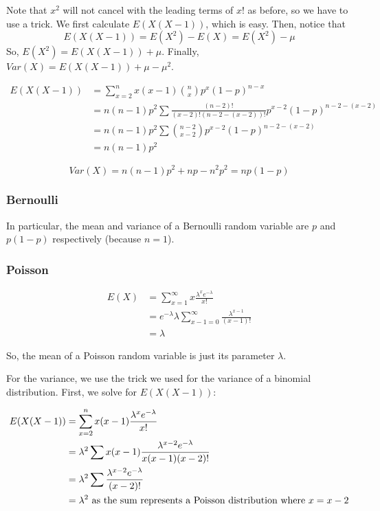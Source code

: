 \documentclass[12pt]{article}
\begin{document}
Note that $x^2$ will not cancel with the leading terms of $x!$ as before, so we have to use a trick. We first calculate $E(X(X-1))$, which is easy. Then, notice that
\[
    E(X (X-1)) = E(X^2) - E(X) = E(X^2) - \mu
\]
So, $E(X^2) = E(X(X-1)) + \mu$. Finally, $Var(X) = E(X(X-1)) + \mu - \mu^2$.

\begin{align*}
    E(X(X-1)) &= \sum_{x=2}^{n} x (x-1) {n \choose x} p^x (1-p)^{n-x} \\
        &= n (n-1) p^2 \sum \frac{(n-2)!}{(x-2)! (n-2-(x-2))!} p^{x-2} (1-p)^{n-2-(x-2)} \\
        &= n (n-1) p^2 \sum {{n-2} \choose {x-2}} p^{x-2} (1-p)^{n-2-(x-2)} \\
        &= n (n-1) p^2
\end{align*}

\[
    Var(X) = n (n-1) p^2 + np - n^2 p^2 = n p (1-p)
\]

\subsubsection{Bernoulli}

In particular, the mean and variance of a Bernoulli random variable are $p$ and $p (1-p)$ respectively (because $n=1$).

\subsubsection{Poisson}

\begin{align*}
    E(X) &= \sum_{x=1}^{\infty} x \frac{\lambda^{x} e^{- \lambda}}{x!} \\
        &= e^{- \lambda} \lambda \sum_{x-1 = 0}^{\infty} \frac{\lambda^{x-1}}{(x-1)!} \\
        &= \lambda
\end{align*}

So, the mean of a Poisson random variable is just its parameter $\lambda$.

For the variance, we use the trick we used for the variance of a binomial distribution. First, we solve for $E(X(X-1))$:

\begin{align*}
    E(X(X-1)) &= \sum_{x=2}^{n} x (x-1) \frac{\lambda^x e^{-\lambda}}{x!}{} \\
        &= \lambda^2 \sum x (x-1) \frac{\lambda^{x-2} e^{-\lambda}}{x(x-1)(x-2)!} \\
        &= \lambda^2 \sum \frac{\lambda^{x-2} e^{-\lambda}}{(x-2)!} \\
        &= \lambda^{2} \textnormal{ as the sum represents a Poisson distribution where } x = x - 2
\end{align*}
\end{document}
